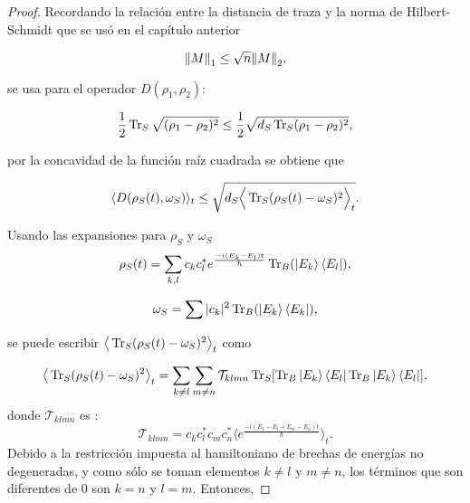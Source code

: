 \begin{proof}
Recordando la relación entre la distancia de traza y la norma de Hilbert-Schmidt que se usó en el capítulo anterior

\begin{equation}
\norm{M}_{1} \le \sqrt{n}\norm{M}_{2},
\end{equation}

se usa para el operador $D(\rho_{1}, \rho_{2})$:

\begin{equation}
\frac{1}{2} \Tr_{S} \sqrt{(\rho_{1} - \rho_{2})^{2}} \le \frac{1}{2}\sqrt{d_{S} \Tr_{S} (\rho_{1}- \rho_{2})^{2}},
\end{equation}

por la concavidad de la función raíz cuadrada se obtiene que

\begin{equation}
\langle D(\rho_{S}(t),\omega_{S}) \rangle_{t} \le \sqrt{  d_{S} \Big \langle \Tr_{S}(\rho_{S}(t)-\omega_{S})^{2} \Big \rangle_{t}}.
\end{equation}

Usando las expansiones para $\rho_{S}$ y $\omega_{S}$
\begin{equation}
\rho_{S}(t)=\sum_{k,l} c_{k} c_{l}^{*} e^{\frac{-i(E_{k}-E_{l})t}{\hbar}} \Tr_{B} (\ket{E_{k}} \bra{E_{l}}),
\end{equation}

\begin{equation}
\omega_{S} = \sum |c_{k}|^{2} \Tr_{B}(\ket{E_{k}} \bra{E_{k}}),
\end{equation}

se puede escribir $ \big \langle \Tr_{S}(\rho_{S}(t)-\omega_{S})^{2} \big \rangle_{t}$ como 

\begin{equation}
\big \langle \Tr_{S}(\rho_{S}(t)-\omega_{S})^{2}  \big \rangle_{t}=\sum_{k \neq l} \sum_{m \neq n} \mathcal{T}_{klmn} \Tr_{S} [\Tr_{B} \ket{E_{k}} \bra{E_{l}} \Tr_{B} \ket{E_{k}} \bra{E_{l}}],
\end{equation}
donde $\mathcal{T}_{klmn}$ es :
\begin{equation}
\mathcal{T}_{klmn}=c_{k}c_{l}^{*}c_{m}c_{n}^{*} \Big \langle e^{\frac{-i(E_{k}-E_{l}+E_{m}-E_{n})t}{\hbar}} \Big \rangle_{t}.
\end{equation}
Debido a la restricción impuesta al hamiltoniano de brechas de energías no degeneradas, y como sólo se toman elementos $k \neq l$ y $m\neq n$, los términos que son diferentes de $0$ son $k=n$ y $l=m$. Entonces,
 

\end{proof}
